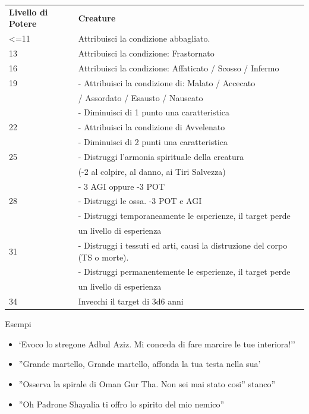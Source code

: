 \documentclass[a4paper,11pt,twoside,openany]{book}
\begin{document}
\bigskip

\begin{tabular}{L{3cm} L{13cm}}
\toprule 
\textbf{Livello di Potere} & \textbf{Creature}\tabularnewline
<=11 &Attribuisci la condizione abbagliato. \\
13 & Attribuisci la condizione: Frastornato\\
16 & Attribuisci la condizione: Affaticato / Scosso / Infermo\\
19 & - Attribuisci la condizione di: Malato / Accecato\\
& / Assordato / Esausto / Nauseato\\
& - Diminuisci di 1 punto una caratteristica\\
22 & - Attribuisci la condizione di Avvelenato\\
& - Diminuisci di 2 punti una caratteristica\\
25 & - Distruggi l’armonia spirituale della creatura \\
&(-2 al colpire, al danno, ai Tiri Salvezza)\\
& - 3 AGI oppure -3 POT\\
28 & - Distruggi le ossa. -3 POT e AGI\\
& - Distruggi temporaneamente le esperienze, il target perde\\
& un livello di esperienza\\
31& - Distruggi i tessuti ed arti, causi la distruzione del corpo (TS o morte).\\
& - Distruggi permanentemente le esperienze, il target perde\\
&un livello di esperienza\\
34 &Invecchi il target di 3d6 anni\\
\end{tabular}

\bigskip

Esempi
\begin{itemize}
\item 
`Evoco lo stregone Adbul Aziz. Mi conceda di fare marcire le tue interiora!'' 
\item 
''Grande martello, Grande martello, affonda la tua testa nella sua' 
\item 
''Osserva la spirale di Oman Gur Tha. Non sei mai stato cosi'' stanco'' 
\item 
''Oh Padrone Shayalia ti offro lo spirito del mio nemico'' 
\end{itemize}

\bigskip
\end{document}
